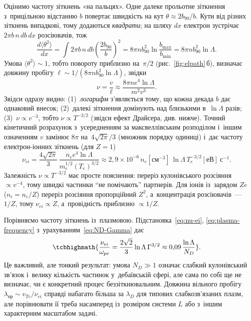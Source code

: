 Оцінимо частоту зіткнень «на пальцях». Одне далеке прольотне зіткнення з~прицільною відстанню $b$
повертає швидкість на кут $\theta\approx2b_{90}/b$. Кути від різних зіткнень випадкові, тому додаються
\emph{квадрати}; на шляху $dx$ електрон зустрічає $2\pi b\,n\,db\,dx$ розсіювачів, тож
$$\frac{d\langle\theta^2\rangle}{dx}=\int2\pi b\,n\,db\left(\frac{2b_{90}}b\right)^2
=8\pi nb_{90}^2\ln\frac{b_{\max}}{b_{\min}}=8\pi nb_{90}^2\ln\Lambda.$$
Умова $\langle\theta^2\rangle\sim1$, тобто повороту приблизно на~$\pi/2$ (рис.~\ref{fig:elpath}\,б), визначає довжину пробігу $\ell\sim1/(8\pi nb_{90}^2\ln\Lambda)$, звідки
$$\nu=\frac v\ell\approx\frac{8\pi ne^4\ln\Lambda}{m^2v^3}.$$
Звідси одразу видно: (1)~\emph{логарифм} з'являється тому, що кожна декада $b$ дає однаковий внесок;
(2)~далекі зіткнення домінують над близькими в~$\ln\Lambda$ разів; (3)~$\nu\propto v^{-3}$, тобто
$\nu\propto T^{-3/2}$ (звідси ефект Драйсера, див. нижче). Точний кінетичний розрахунок з~усередненням за
максвеллівським розподілом і~іншим означенням $v$ замінює $8\pi$ на~$4\sqrt{2\pi}/3$ (множник порядку одиниці)
і~дає частоту електрон-іонних зіткнень (для $Z=1$)
\begin{equation}\label{eq:nu-ei}
	\nu_{ei}=\frac{4\sqrt{2\pi}}3\,\frac{n_ee^4\ln\Lambda}{m_e^{1/2}(T_e)^{3/2}}\approx2{,}9\times10^{-6}\,n_e[\mathrm{см}^{-3}]\,\ln\Lambda\,T_e^{-3/2}[\text{еВ}]~\mathrm{с}^{-1}.
\end{equation}
Залежність $\nu\propto T^{-3/2}$ має просте пояснення: переріз кулонівського розсіяння
$\propto v^{-4}$, тому швидкі частинки \enquote{не помічають} партнерів. Для іонів
із~зарядом $Ze$ ($n_i=n_e/Z$) переріз розсіяння пропорційний $Z^2$, а~концентрація
розсіювачів~--- $1/Z$, тому $\nu_{ei}\propto Z$, а~провідність приблизно $\propto1/Z$.

Порівняємо частоту зіткнень із~плазмовою. Підстановка~\eqref{eq:nu-ei},
\eqref{eq:plasma-frequency} з~урахуванням~\eqref{eq:ND-Gamma} дає
\begin{equation}\label{eq:collisionless}
	\tcbhighmath{\frac{\nu_{ei}}{\omega_{pe}}=\frac{2\sqrt2}3\ln\Lambda\,\Gamma^{3/2}\approx0{,}09\,\frac{\ln\Lambda}{N_D}}.
\end{equation}
Це важливий, але тонкий результат: умова $N_D\gg1$ означає слабкий кулонівський зв'язок
і~велику кількість частинок у~дебаївській сфері, але сама по собі ще не визначає, чи є
конкретний процес беззіткнювальним. Довжина вільного пробігу $\lambda_{\mathrm{пр}}\sim
v_{Te}/\nu_{ei}$ справді набагато більша за $\lambda_D$ для типових слабкозв'язаних плазм,
але порівнювати її треба насамперед із~розміром системи $L$ або з~іншим характерним
масштабом задачі.

